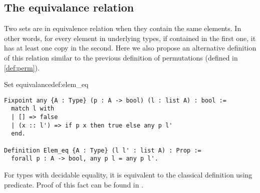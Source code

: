 \subsection{The equivalance relation}
Two sets are in equivalence relation when they contain the same elements. In other words, for every element in underlying types, if contained in the first one, it has at least one copy in the second. Here we also propose an alternative definition of this relation similar to the previous definition of permutations (defined in \ref{def:perm}).
\begin{defi}{Set equivalance}{def:elem_eq}
\begin{verbatim}
Fixpoint any {A : Type} (p : A -> bool) (l : list A) : bool :=
  match l with
  | [] => false
  | (x :: l') => if p x then true else any p l'
  end.

Definition Elem_eq {A : Type} (l l' : list A) : Prop := 
  forall p : A -> bool, any p l = any p l'.
\end{verbatim}
\end{defi}
For types with decidable equality, it is equivalent to the classical definition using  predicate. Proof of this fact can be found in .
